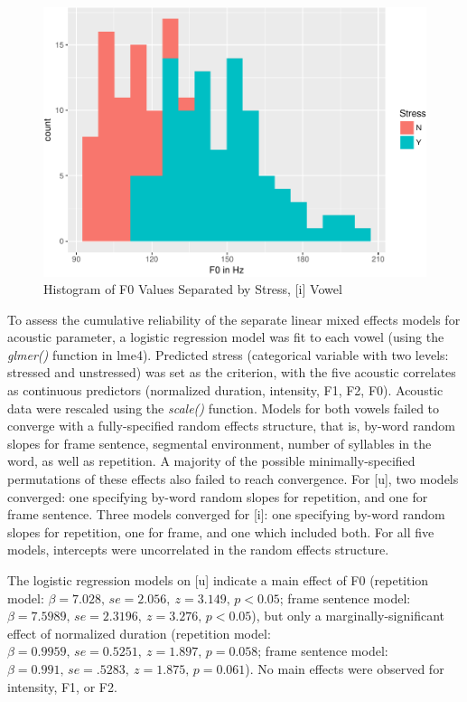 \documentclass[english,man]{apa6}
\theoremstyle{definition}
\theoremstyle{definition}
\theoremstyle{definition}
\theoremstyle{remark}
\begin{document}
\begin{figure}
\centering
\includegraphics{lithuanian_article_files/figure-latex/Figure10-1.pdf}
\caption{\label{fig:Figure10}Histogram of F0 Values Separated by Stress,
{[}i{]} Vowel}
\end{figure}

To assess the cumulative reliability of the separate linear mixed
effects models for acoustic parameter, a logistic regression model was
fit to each vowel (using the \emph{glmer()} function in lme4). Predicted
stress (categorical variable with two levels: stressed and unstressed)
was set as the criterion, with the five acoustic correlates as
continuous predictors (normalized duration, intensity, F1, F2, F0).
Acoustic data were rescaled using the \emph{scale()} function. Models
for both vowels failed to converge with a fully-specified random effects
structure, that is, by-word random slopes for frame sentence, segmental
environment, number of syllables in the word, as well as repetition. A
majority of the possible minimally-specified permutations of these
effects also failed to reach convergence. For {[}u{]}, two models
converged: one specifying by-word random slopes for repetition, and one
for frame sentence. Three models converged for {[}i{]}: one specifying
by-word random slopes for repetition, one for frame, and one which
included both. For all five models, intercepts were uncorrelated in the
random effects structure.

The logistic regression models on {[}u{]} indicate a main effect of F0
(repetition model:
\(\beta = 7.028, \, se = 2.056, \ z=3.149, \, p<0.05\); frame sentence
model: \(\beta = 7.5989, \, se = 2.3196, \ z=3.276, \, p<0.05\)), but
only a marginally-significant effect of normalized duration (repetition
model: \(\beta = 0.9959, \, se = 0.5251, \ z=1.897, \, p = 0.058\);
frame sentence model:
\(\beta = 0.991, \, se = .5283, \ z=1.875, \, p=0.061\)). No main
effects were observed for intensity, F1, or F2.
\end{document}
